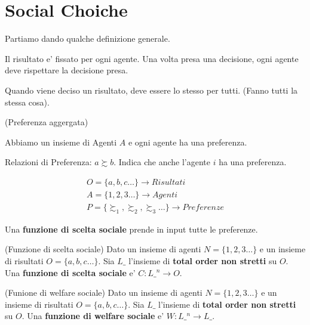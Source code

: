 \section{Social Choiche}
\label{sec:social-choice}

Partiamo dando qualche definizione generale.

Il risultato e' fissato per ogni agente. Una volta presa una decisione, ogni
agente deve rispettare la decisione presa.

Quando viene deciso un risultato, deve essere lo stesso per tutti. (Fanno tutti
la stessa cosa).

\begin{definition}(Preferenza aggergata)

    Abbiamo un insieme di Agenti $A$ e ogni agente ha una preferenza.

    Relazioni di Preferenza: $a \succsim b$. Indica che anche l'agente $i$ ha una
    preferenza.

    \begin{equation}
        \begin{aligned}
            O = \{a,b,c\dots\} \rightarrow Risultati \\
            A = \{1,2,3\dots\} \rightarrow Agenti    \\
            P = \{ \succsim_1, \succsim_2, \succsim_3\dots\} \rightarrow Preferenze
        \end{aligned}
    \end{equation}
\end{definition}

Una \textbf{funzione di scelta sociale} prende in input tutte le preferenze.

\begin{definition}(Funzione di scelta sociale)
    Dato un insieme di agenti $N = \{1,2,3\dots\}$ e un insieme di risultati $O = \{a,b,c\dots\}$.
    Sia $L\_$ l'insieme di \textbf{total order non stretti} su $O$. Una \textbf{funzione
        di scelta sociale} e' $C: L\_^n \rightarrow O$.
\end{definition}

\begin{definition}(Funione di welfare sociale)
    Dato un insieme di agenti $N = \{1,2,3\dots\}$ e un insieme di risultati $O = \{a,b,c\dots\}$.
    Sia $L\_$ l'insieme di \textbf{total order non stretti} su $O$. Una \textbf{funzione
        di welfare sociale} e' $W: L\_^n \rightarrow L\_$.
\end{definition}

